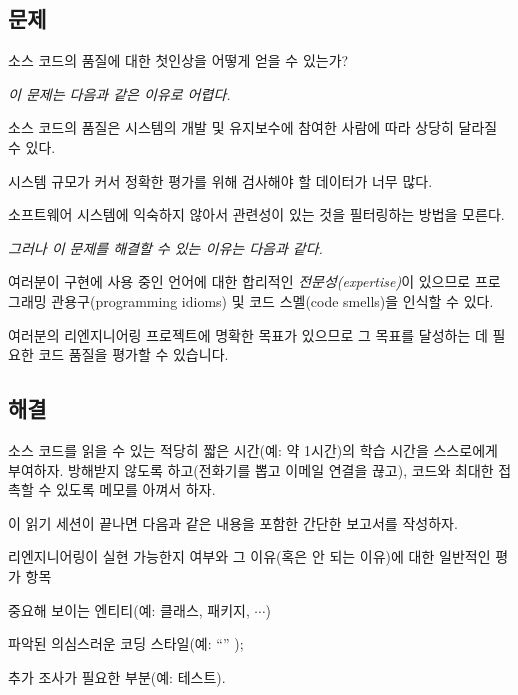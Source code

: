 \documentclass[a4paper,10pt,twoside]{book}
\begin{document}


\subsection*{문제}

소스 코드의 품질에 대한 첫인상을 어떻게 얻을 수 있는가?

\emph{이 문제는 다음과 같은 이유로 어렵다.}

\begin{bulletlist}
  \item 소스 코드의 품질은 시스템의 개발 및 유지보수에 참여한 사람에 따라 상당히 달라질 수 있다.

  \item 시스템 규모가 커서 정확한 평가를 위해 검사해야 할 데이터가 너무 많다.

  \item 소프트웨어 시스템에 익숙하지 않아서 관련성이 있는 것을 필터링하는 방법을 모른다.
\end{bulletlist}

\emph{그러나 이 문제를 해결할 수 있는 이유는 다음과 같다.}

\begin{bulletlist}
  \item 여러분이 구현에 사용 중인 언어에 대한 합리적인 \emph{전문성(expertise)}이 있으므로 프로그래밍 관용구(programming idioms) 및 코드 스멜(code smells)을 인식할 수 있다.

  \item 여러분의 리엔지니어링 프로젝트에 명확한 목표가 있으므로 그 목표를 달성하는 데 필요한 코드 품질을 평가할 수 있습니다.

\end{bulletlist}

\subsection*{해결}

소스 코드를 읽을 수 있는 적당히 짧은 시간(예: 약 1시간)의 학습 시간을 스스로에게 부여하자. 방해받지 않도록 하고(전화기를 뽑고 이메일 연결을 끊고), 코드와 최대한 접촉할 수 있도록 메모를 아껴서 하자. 

이 읽기 세션이 끝나면 다음과 같은 내용을 포함한 간단한 보고서를 작성하자.
\begin{bulletlist}
  \item 리엔지니어링이 실현 가능한지 여부와 그 이유(혹은 안 되는 이유)에 대한 일반적인 평가 항목

  \item 중요해 보이는 엔티티(예: 클래스, 패키지, $\cdots$)

  \item 파악된 의심스러운 코딩 스타일(예: ``'' \cite{Fowl99a});

  \item 추가 조사가 필요한 부분(예: 테스트).

\end{bulletlist}
\end{document}
